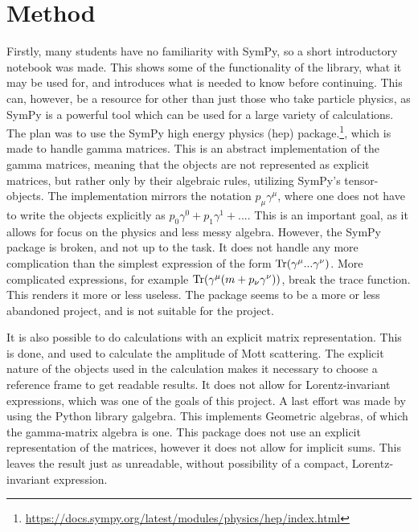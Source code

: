 \documentclass{article}
\begin{document}
    \section*{Method}
    Firstly, many students have no familiarity with SymPy, so a short introductory notebook was made.
    This shows some of the functionality of the library, what it may be used for, and introduces what is needed to know before continuing.
    This can, however, be a resource for other than just those who take particle physics, as SymPy is a powerful tool which can be used for a large variety of calculations.
    The plan was to use the SymPy high energy physics (hep) package.\footnote{\url{https://docs.sympy.org/latest/modules/physics/hep/index.html}}, which is made to handle gamma matrices.
    This is an abstract implementation of the gamma matrices, meaning that the objects are not represented as explicit matrices, but rather only by their algebraic rules, utilizing SymPy’s tensor-objects.
    The implementation mirrors the notation $p_\mu \gamma^\mu$, where one does not have to write the objects explicitly as $p_0 \gamma^0 + p_1 \gamma^1 +...$.
    This is an important goal, as it allows for focus on the physics and less messy algebra.
    However, the SymPy package is broken, and not up to the task.
    It does not handle any more complication than the simplest expression of the form $\Tr(\gamma^\mu ...
    \gamma^\nu)$.
    More complicated expressions, for example $\Tr(\gamma^\mu (m + p_\nu\gamma^\nu))$, break the trace function.
    This renders it more or less useless.
    The package seems to be a more or less abandoned project, and is not suitable for the project.
       
    It is also possible to do calculations with an explicit matrix representation.
    This is done, and used to calculate the amplitude of Mott scattering.
    The explicit nature of the objects used in the calculation makes it necessary to choose a reference frame to get readable results.
    It does not allow for Lorentz-invariant expressions, which was one of the goals of this project.
    A last effort was made by using the Python library galgebra.
    This implements Geometric algebras, of which the gamma-matrix algebra is one.
    This package does not use an explicit representation of the matrices, however it does not allow for implicit sums.
    This leaves the result just as unreadable, without possibility of a compact, Lorentz-invariant expression.
       
\end{document}
